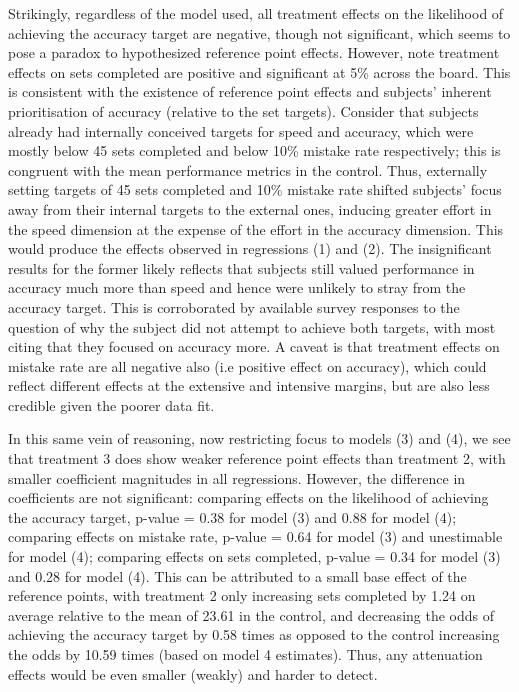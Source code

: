 \documentclass[
  12,
  letterpaper,
  DIV=11,
  numbers=noendperiod]{scrartcl}
\begin{document}
Strikingly, regardless of the model used, all treatment effects on the
likelihood of achieving the accuracy target are negative, though not
significant, which seems to pose a paradox to hypothesized reference
point effects. However, note treatment effects on sets completed are
positive and significant at 5\% across the board. This is consistent
with the existence of reference point effects and subjects' inherent
prioritisation of accuracy (relative to the set targets). Consider that
subjects already had internally conceived targets for speed and
accuracy, which were mostly below 45 sets completed and below 10\%
mistake rate respectively; this is congruent with the mean performance
metrics in the control. Thus, externally setting targets of 45 sets
completed and 10\% mistake rate shifted subjects' focus away from their
internal targets to the external ones, inducing greater effort in the
speed dimension at the expense of the effort in the accuracy dimension.
This would produce the effects observed in regressions (1) and (2). The
insignificant results for the former likely reflects that subjects still
valued performance in accuracy much more than speed and hence were
unlikely to stray from the accuracy target. This is corroborated by
available survey responses to the question of why the subject did not
attempt to achieve both targets, with most citing that they focused on
accuracy more. A caveat is that treatment effects on mistake rate are
all negative also (i.e positive effect on accuracy), which could reflect
different effects at the extensive and intensive margins, but are also
less credible given the poorer data fit.

In this same vein of reasoning, now restricting focus to models (3) and
(4), we see that treatment 3 does show weaker reference point effects
than treatment 2, with smaller coefficient magnitudes in all
regressions. However, the difference in coefficients are not
significant: comparing effects on the likelihood of achieving the
accuracy target, p-value = 0.38 for model (3) and 0.88 for model (4);
comparing effects on mistake rate, p-value = 0.64 for model (3) and
unestimable for model (4); comparing effects on sets completed, p-value
= 0.34 for model (3) and 0.28 for model (4). This can be attributed to a
small base effect of the reference points, with treatment 2 only
increasing sets completed by 1.24 on average relative to the mean of
23.61 in the control, and decreasing the odds of achieving the accuracy
target by 0.58 times as opposed to the control increasing the odds by
10.59 times (based on model 4 estimates). Thus, any attenuation effects
would be even smaller (weakly) and harder to detect.
\end{document}
